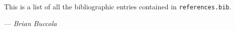 \documentclass{article}
\newcommand{\myname}{Brian Buccola}
\begin{document}
This is a list of all the bibliographic entries contained in
\texttt{references.bib}.

\hfill --- \textit{\myname}


\nocite{*}


\end{document}
